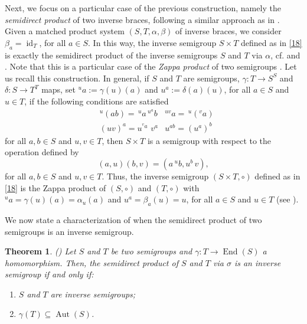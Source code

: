 \documentclass[preprint,1p]{elsarticle}
\newtheorem{theor}{Theorem}[section]
\theoremstyle{definition}               %
\DeclareMathOperator{\Aut}{Aut}
\DeclareMathOperator{\End}{End}
\DeclareMathOperator{\id}{id}
\begin{document}
\bigskip
Next, we focus on a particular case of the previous construction, namely the \emph{semidirect product} of two inverse braces, following a similar approach as in \cite[p. 597]{CaMaSt21}. \\Given a matched product system $\left(S, T, \alpha, \beta\right)$ of inverse braces, we consider $\beta_a = \id_T$, for all $a\in S$. In this way, the inverse semigroup $S\times T$ defined as in \cref{18} is exactly the semidirect product of the inverse semigroups $S$ and $T$ via $\alpha$, cf. \cite{Ni83} and \cite{Pr86}. 
Note that this is a particular case of the \emph{Zappa product} of two semigroups \cite{Ku83}. Let us recall this construction. In general, if $S$ and $T$ are semigroups, $\gamma:T\to S^{S}$ and $\delta:S\to T^{T}$ maps, set $^u a:= \gamma\left(u\right)\left(a\right)$ and $u^a:= \delta\left(a\right)\left(u\right)$, for all $a\in S$ and $u\in T$, if the following conditions are satisfied
	\begin{align}\label{S1}
	&^{u}(ab)=\,^ua \, ^{u^a}b	
	&^{uv}a = \, ^u(^va) \tag{Z1}\\
	\label{S2}&( uv)^a = u^{^va} \,\, v^a&u^{ab}=(u^a)^b\tag{Z2}
				\end{align}
for all $a,b \in S$ and $u,v \in T$, then $S \times T$ is a semigroup with respect to the operation defined by
	\begin{equation*}\label{prod-semigruppo-match}	\left(a,u\right)\left(b,v\right)=\left(a\,^ub, u^b\,v\right),
	\end{equation*}
	for all $a,b \in S$ and $u,v \in T$.
Thus, the inverse semigroup $(S\times T, \circ)$ defined as in \cref{18} is the Zappa product of $(S, \circ)$ and $(T, \circ)$ with $^{u}a = \gamma\left(u\right)\left(a\right) = \alpha_u\left(a\right)$  and $u^a = \beta_a\left(u\right) = u$, for all $a\in S$ and $u\in T$ (see \cite[Remark 5]{CaMaSt21}). 

\smallskip

We now state a characterization of when the semidirect product of two semigroups is an inverse semigroup.
\begin{theor}\label{th:char-semiprod} \emph{(\cite[cf. Theorem 6]{Pr86})}
	Let $S$ and $T$ be two semigroups and $\gamma:T\to \End(S)$ a homomorphism. Then, the semidirect product of $S$ and $T$ via $\sigma$ is an inverse semigroup if and only if:
	\begin{enumerate}
		\item[\rm{(1)}]$S$ and $T$ are inverse semigroups;
	\item[\rm{(2)}]$\gamma(T)\subseteq \Aut(S)$.
	\end{enumerate}
\end{theor}
\end{document}

